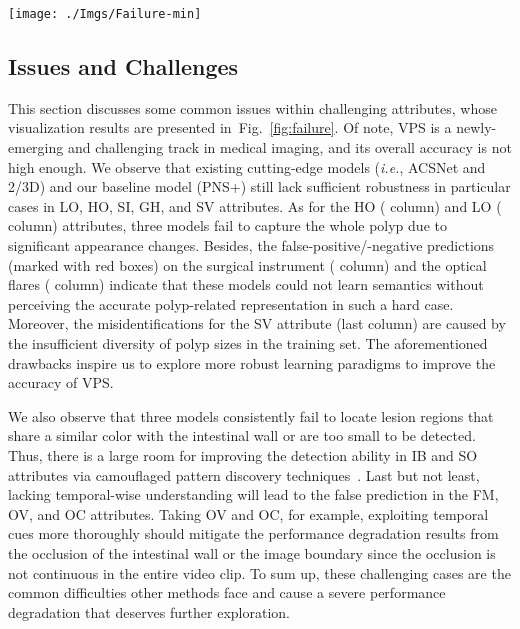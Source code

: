 \documentclass[default,iicol]{sn-jnl}
\theoremstyle{thmstyleone}
\theoremstyle{thmstyletwo}
\theoremstyle{thmstylethree}
\newcommand{\figref}[1]{Fig.~\ref{#1}}
\newcommand{\secref}[1]{Sec.~\ref{#1}}
\def\ie{\emph{i.e.}}
\def\ourmodel{PNS+}
\begin{document}
\begin{figure*}[t!]
    \centering
    \texttt{[image: ./Imgs/Failure-min]}
    \caption{Challenging samples were taken from ten visual attributes.
More analyses can be referred to~\secref{sec:failure_case}.}
    \label{fig:failure}
\end{figure*}

\subsection{Issues and Challenges}\label{sec:failure_case}
This section discusses some common issues within challenging attributes, whose visualization results are presented in~\figref{fig:failure}.
Of note, VPS is a newly-emerging and challenging track in medical imaging, and its overall accuracy is not high enough.
We observe that existing cutting-edge models (\ie, ACSNet and 2/3D) and our baseline model (\ourmodel) still lack sufficient robustness in particular cases in LO, HO, SI, GH, and SV attributes.
As for the HO ( column) and LO ( column) attributes, three models fail to capture the whole polyp due to significant appearance changes.
Besides, the false-positive/-negative predictions (marked with red boxes) on the surgical instrument ( column) and the optical flares ( column) indicate that these models could not learn semantics without perceiving the accurate polyp-related representation in such a hard case.
Moreover, the misidentifications for the SV attribute (last column) are caused by the insufficient diversity of polyp sizes in the training set.
The aforementioned drawbacks inspire us to explore more robust learning paradigms to improve the accuracy of VPS.

We also observe that three models consistently fail to locate lesion regions that share a similar color with the intestinal wall or are too small to be detected.
Thus, there is a large room for improving the detection ability in IB and SO attributes via camouflaged pattern discovery techniques~\cite{fan2021concealed,ji2022gradient}.
Last but not least, lacking temporal-wise understanding will lead to the false prediction in the FM, OV, and OC attributes.
Taking OV and OC, for example, exploiting temporal cues more thoroughly should mitigate the performance degradation results from the occlusion of the intestinal wall or the image boundary since the occlusion is not continuous in the entire video clip.
To sum up, these challenging cases are the common difficulties other methods face and cause a severe performance degradation that deserves further exploration.
\end{document}
